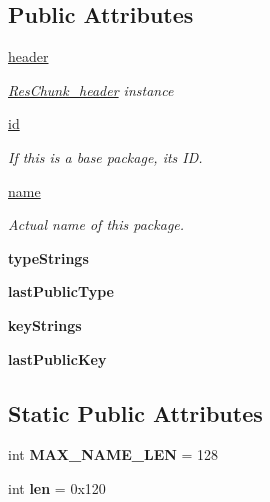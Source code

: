 \subsection*{Public Attributes}
\begin{DoxyCompactItemize}
\item 
\mbox{\hyperlink{classpackage_1_1ResTable__package__header_a6de11850cfa30e936ae7b0c6b0c852c2}{header}}
\begin{DoxyCompactList}\small\item\em \mbox{\hyperlink{}{Res\+Chunk\+\_\+header}} instance \end{DoxyCompactList}\item 
\mbox{\hyperlink{classpackage_1_1ResTable__package__header_a2726e7fc9dac06c2ff225fbab0a896d2}{id}}
\begin{DoxyCompactList}\small\item\em If this is a base package, its ID. \end{DoxyCompactList}\item 
\mbox{\hyperlink{classpackage_1_1ResTable__package__header_a343dde2c971c41ce8362aedf4d87118f}{name}}
\begin{DoxyCompactList}\small\item\em Actual name of this package. \end{DoxyCompactList}\item 
\mbox{\label{classpackage_1_1ResTable__package__header_a086932202e2bedcb227a26451b57a764}} 
{\bfseries type\+Strings}
\item 
\mbox{\label{classpackage_1_1ResTable__package__header_a846ccdc565146fd47c12899a9e39b1bf}} 
{\bfseries last\+Public\+Type}
\item 
\mbox{\label{classpackage_1_1ResTable__package__header_a75d141bb51950bff52b844e6a74cbf4d}} 
{\bfseries key\+Strings}
\item 
\mbox{\label{classpackage_1_1ResTable__package__header_a94c9bf56c3952de8b94f2326cd38695d}} 
{\bfseries last\+Public\+Key}
\end{DoxyCompactItemize}
\subsection*{Static Public Attributes}
\begin{DoxyCompactItemize}
\item 
\mbox{\label{classpackage_1_1ResTable__package__header_ad730e854d401af1b2b4cefb5826f206c}} 
int {\bfseries M\+A\+X\+\_\+\+N\+A\+M\+E\+\_\+\+L\+EN} = 128
\item 
\mbox{\label{classpackage_1_1ResTable__package__header_ab14f9295c11038a4a1da4938fcf528fd}} 
int {\bfseries len} = 0x120
\end{DoxyCompactItemize}


